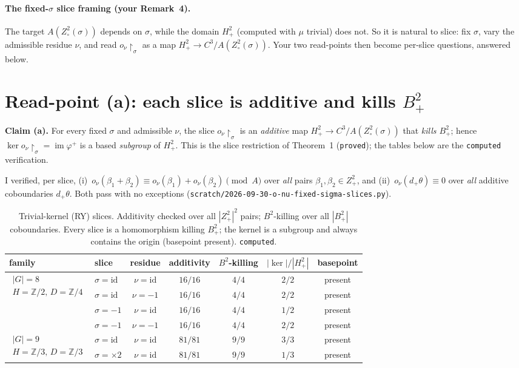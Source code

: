 \documentclass[11pt]{article}
\newcommand{\im}{\operatorname{im}}
\newcommand{\id}{\mathrm{id}}
\newcommand{\Z}{\mathbb{Z}}
\begin{document}
\paragraph{The fixed-$\sigma$ slice framing (your Remark~4).}
The target $A(Z^2_\circ(\sigma))$ depends on $\sigma$, while the domain $H^2_+$
(computed with $\mu$ trivial) does not. So it is natural to slice: fix $\sigma$,
vary the admissible residue $\nu$, and read $o_\nu\restriction_\sigma$ as a map
$H^2_+\to C^3/A(Z^2_\circ(\sigma))$. Your two read-points then become per-slice
questions, answered below.

\section{Read-point (a): each slice is additive and kills $B^2_+$}

\textbf{Claim (a).} For every fixed $\sigma$ and admissible $\nu$, the slice
$o_\nu\restriction_\sigma$ is an \emph{additive} map $H^2_+\to C^3/A(Z^2_\circ(\sigma))$
that \emph{kills $B^2_+$}; hence $\ker o_\nu\restriction_\sigma=\im\varphi^+$ is a
based \emph{subgroup} of $H^2_+$. This is the slice restriction of
Theorem~1 (\texttt{proved}); the tables below are the \texttt{computed}
verification.

I verified, per slice, (i)~$o_\nu(\beta_1+\beta_2)\equiv o_\nu(\beta_1)+o_\nu(\beta_2)
\pmod{A}$ over \emph{all} pairs $\beta_1,\beta_2\in Z^2_+$, and
(ii)~$o_\nu(d_+\theta)\equiv 0$ over \emph{all} additive coboundaries $d_+\theta$.
Both pass with no exceptions
(\texttt{scratch/2026-09-30-o-nu-fixed-sigma-slices.py}).

\begin{table}[h]
\centering
\small
\begin{tabular}{llccccc}
\toprule
family & slice & residue & additivity & $B^2$-killing & $|\ker|/|H^2_+|$ & basepoint\\
\midrule
\multirow{4}{*}{$\substack{|G|=8\\ H{=}\Z/2,\,D{=}\Z/4}$}
 & $\sigma=\id$   & $\nu=\id$  & $16/16$ & $4/4$ & $2/2$ & present\\
 & $\sigma=\id$   & $\nu=-1$   & $16/16$ & $4/4$ & $2/2$ & present\\
 & $\sigma=-1$    & $\nu=\id$  & $16/16$ & $4/4$ & $1/2$ & present\\
 & $\sigma=-1$    & $\nu=-1$   & $16/16$ & $4/4$ & $2/2$ & present\\
\midrule
\multirow{2}{*}{$\substack{|G|=9\\ H{=}\Z/3,\,D{=}\Z/3}$}
 & $\sigma=\id$   & $\nu=\id$  & $81/81$ & $9/9$ & $3/3$ & present\\
 & $\sigma={\times}2$ & $\nu=\id$ & $81/81$ & $9/9$ & $1/3$ & present\\
\bottomrule
\end{tabular}
\caption{Trivial-kernel (RY) slices. Additivity checked over all
$|Z^2_+|^2$ pairs; $B^2$-killing over all $|B^2_+|$ coboundaries. Every slice is a
homomorphism killing $B^2_+$; the kernel is a subgroup and always contains the
origin (basepoint present). \texttt{computed}.}
\end{table}
\end{document}
